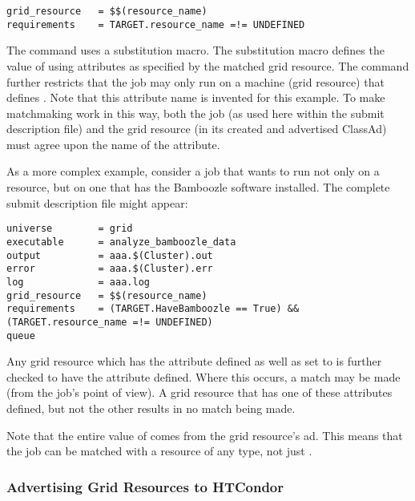 \footnotesize
\begin{verbatim}
grid_resource   = $$(resource_name)
requirements    = TARGET.resource_name =!= UNDEFINED
\end{verbatim}
\normalsize

The  command uses a substitution
macro.
The substitution macro defines the value 
of  using attributes
as specified by the matched grid resource.
The  command further restricts that
the job may only run on a machine (grid resource) that
defines .
Note that this attribute name is invented for this example.
To make matchmaking work in this way,
both the job (as used here within the submit description file)
and the grid resource (in its created and advertised ClassAd)
must agree upon the name of the attribute.

As a more complex example,
consider a job that wants
to run not only
on a  resource,
but on one that has the Bamboozle software installed.
The complete submit description file might appear:

\footnotesize
\begin{verbatim}
universe        = grid
executable      = analyze_bamboozle_data
output          = aaa.$(Cluster).out
error           = aaa.$(Cluster).err
log             = aaa.log
grid_resource   = $$(resource_name)
requirements    = (TARGET.HaveBamboozle == True) && (TARGET.resource_name =!= UNDEFINED)
queue
\end{verbatim}
\normalsize

Any grid resource which has the
 attribute defined as well as
set to  is further checked to have the
 attribute defined.
Where this occurs, a match may be made (from the
job's point of view).
A grid resource that has one of these attributes defined,
but not the other results in no match being made.

Note that the entire value of  comes from
the grid resource's ad. This means that the job can be matched with
a resource of any type, not just .

\subsubsection{Advertising Grid Resources to HTCondor}

